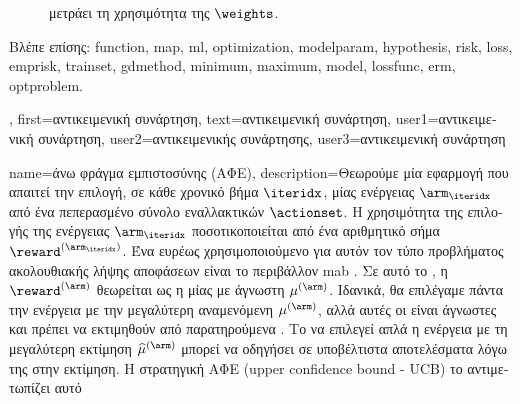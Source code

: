 {{\begin{figure}[H]
{{{			μετράει τη χρησιμότητα της} $\weights$.\label{fig_obj_func_dict}} }
		\end{figure} 
		\foreignlanguage{greek}{Βλέπε επίσης:} \gls{function}, \gls{map}, \gls{ml}, \gls{optimization}, \gls{modelparam}, \gls{hypothesis}, \gls{risk}, 
		\gls{loss}, \gls{emprisk}, \gls{trainset}, \gls{gdmethod}, \gls{minimum}, \gls{maximum}, \gls{model}, \gls{lossfunc}, \gls{erm}, \gls{optproblem}.},
	first={\foreignlanguage{greek}{αντικειμενική συνάρτηση}},
	text={\foreignlanguage{greek}{αντικειμενική συνάρτηση}},
	user1={\foreignlanguage{greek}{αντικειμενική συνάρτηση}}, %
  	user2={\foreignlanguage{greek}{αντικειμενικής συνάρτησης}}, %
	user3={\foreignlanguage{greek}{αντικειμενική συνάρτηση}} %
}

{name={\foreignlanguage{greek}{άνω φράγμα εμπιστοσύνης (ΑΦΕ)}},
	description={\foreignlanguage{greek}{Θεωρούμε μία εφαρμογή} 
		 \foreignlanguage{greek}{που απαιτεί την επιλογή, σε κάθε χρονικό βήμα $\iteridx$, μίας ενέργειας 
		$\arm_{\iteridx}$ από ένα πεπερασμένο σύνολο εναλλακτικών $\actionset$.} \foreignlanguage{greek}{Η χρησιμότητα της 
		επιλογής της ενέργειας $\arm_{\iteridx}$ ποσοτικοποιείται από ένα αριθμητικό σήμα}  
		$\reward^{(\arm_{\iteridx})}$. \foreignlanguage{greek}{Ένα ευρέως χρησιμοποιούμενο}  
		\foreignlanguage{greek}{για αυτόν τον τύπο προβλήματος ακολουθιακής λήψης αποφάσεων είναι το περιβάλλον} 
		 \gls{mab} \cite{Bubeck2012}. \foreignlanguage{greek}{Σε αυτό το} , 
		\foreignlanguage{greek}{η}  $\reward^{(\arm)}$ \foreignlanguage{greek}{θεωρείται ως η} 
		 \foreignlanguage{greek}{μίας}  \foreignlanguage{greek}{με άγνωστη} 
		 $\mu^{(\arm)}$. \foreignlanguage{greek}{Ιδανικά, θα επιλέγαμε πάντα την ενέργεια με την 
		μεγαλύτερη αναμενόμενη}  $\mu^{(\arm)}$, \foreignlanguage{greek}{αλλά αυτές οι}  
		 \foreignlanguage{greek}{είναι άγνωστες και πρέπει να εκτιμηθούν από παρατηρούμενα} . 
		\foreignlanguage{greek}{Το να επιλε\-γεί απλά η ενέργεια με τη μεγαλύτερη εκτίμηση $\widehat{\mu}^{(\arm)}$ 
		μπορεί να οδηγήσει σε υποβέλτιστα αποτελέσματα λόγω της}  \foreignlanguage{greek}{στην 
		εκτίμηση. Η στρατηγική ΑΦΕ} (upper confidence bound - UCB) \foreignlanguage{greek}{το αντιμετωπίζει αυτό 
}}}
